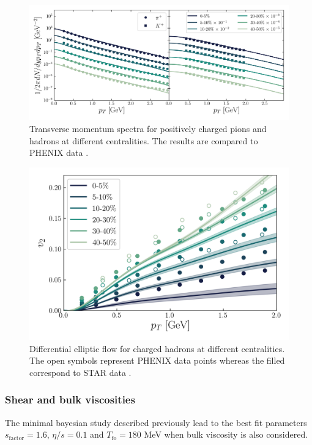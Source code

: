 \begin{figure}[h!]
	\includegraphics{images/plot_ptspectra_shear.png}
	\caption{\normalsize Transverse momentum spectra for positively charged pions and hadrons at different centralities. The results are compared to {\sffamily PHENIX} data \cite{Adler:2003cb}.}
\end{figure}

\begin{figure}[!hbt]
	\includegraphics[width=\textwidth]{images/vn_pt.png}
	\caption{\normalsize Differential elliptic flow for charged hadrons at different centralities. The open symbols represent {\sffamily PHENIX} data points \cite{Adare:2011tg} whereas the filled correspond to {\sffamily STAR} data \cite{Adams:2004bi}.} 
\end{figure}

\newpage
\subsubsection*{Shear and bulk viscosities}
The minimal bayesian study described previously lead to the best fit parameters $s_\text{factor}=1.6$, $\eta/s=0.1$ and $T_\text{fo}=180$ MeV when bulk viscosity is also considered.

